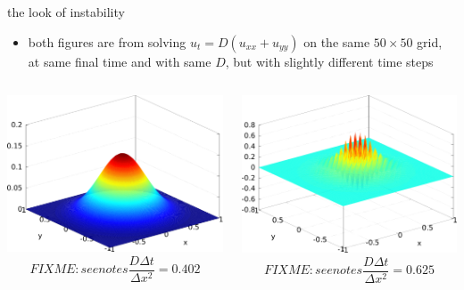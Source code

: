 \begin{frame}{the look of instability}

\begin{itemize}
\item both figures are from solving $u_t = D(u_{xx} + u_{yy})$ on the same $50\times 50$ grid, at same final time and with same $D$, but with slightly different time steps
\end{itemize}

\bigskip
\begin{columns}
\begin{column}{0.5\textwidth}
\begin{center}
\includegraphics[width=1.0\textwidth]{photos/stability}
  $$FIXME: see notes \frac{D\Delta t}{\Delta x^2}= 0.402$$
\end{center}
\end{column}
\begin{column}{0.5\textwidth}
\begin{center}
\includegraphics[width=1.0\textwidth]{photos/instability}
  $$FIXME: see notes \frac{D\Delta t}{\Delta x^2}= 0.625$$
\end{center}
\end{column}
\end{columns}
\end{frame}


